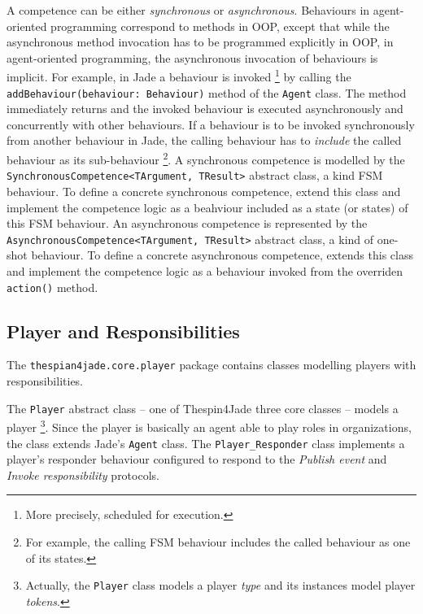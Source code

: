 A competence can be either \textit{synchronous} or \textit{asynchronous}.
Behaviours in agent-oriented programming correspond to methods in OOP, except that while the asynchronous method invocation has to be programmed explicitly in OOP, in agent-oriented programming, the asynchronous invocation of behaviours is implicit.
For example, in Jade a behaviour is invoked
\footnote{More precisely, scheduled for execution.}
by calling the \texttt{addBehaviour(behaviour: Behaviour)} method of the \texttt{Agent} class.
The method immediately returns and the invoked behaviour is executed asynchronously and concurrently with other behaviours.
If a behaviour is to be invoked synchronously from another behaviour in Jade, the calling behaviour has to \textit{include} the called behaviour as its sub-behaviour
\footnote{For example, the calling FSM behaviour includes the called behaviour as one of its states.}.
A synchronous competence is modelled by the \texttt{SynchronousCompetence<TArgument, TResult>} abstract class, a kind FSM behaviour.
To define a concrete synchronous competence, extend this class and implement the competence logic as a beahviour included as a state (or states) of this FSM behaviour.
An asynchronous competence is represented by the \texttt{AsynchronousCompetence<TArgument, TResult>} abstract class, a kind of one-shot behaviour.
To define a concrete asynchronous competence, extends this class and implement the competence logic as a behaviour invoked from the overriden \texttt{action()} method.

\subsection{Player and Responsibilities}

The \texttt{thespian4jade.core.player} package contains classes modelling players with responsibilities.

The \texttt{Player} abstract class -- one of Thespin4Jade three core classes -- models a player
\footnote{Actually, the \texttt{Player} class models a player \textit{type} and its instances model player \textit{tokens}.}.
Since the player is basically an agent able to play roles in organizations, the class extends Jade's \texttt{Agent} class.
The \texttt{Player\_Responder} class implements a player's responder behaviour configured to respond to the \textit{Publish event} and \textit{Invoke responsibility} protocols.

